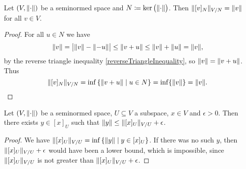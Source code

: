 \begin{proposition} \label{quotientNormFromKernelSeminorm}
Let $\sSet{V,\norm{\cdot}}$ be a seminormed space and $N \coloneqq \ker\big(\lVert\cdot\rVert\big)$. Then $\lVert[v]_N\rVert_{V/N} = \lVert v\rVert$ for all $v\in V$.
\end{proposition}
\begin{proof}
For all $u\in N$ we have
\[ \lVert v\rVert = \big|\lVert v\rVert - \lVert-u\rVert\big| \leq \lVert v + u\rVert \leq \lVert v\rVert+\lVert u\rVert = \lVert v\rVert, \]
by the reverse triangle inequality \ref{reverseTriangleInequality}, so $\lVert v\rVert = \lVert v+u\rVert$. Thus
\[ \norm{[v]_N}_{V/N} = \inf \setbuilder{\norm{v+u}}{u\in N} = \inf\{\norm{v}\} = \norm{v}. \]
\end{proof}

\begin{lemma} \label{approximationToQuotientNormLemma}
Let $\sSet{V,\norm{\cdot}}$ be a seminormed space, $U\subseteq V$ a subspace, $x\in V$ and $\epsilon > 0$. Then there exists $y\in [x]_U$ such that $\lVert y\rVert \leq \lVert[x]_U\rVert_{V/U} + \epsilon$.
\end{lemma}
\begin{proof}
We have $\norm{[x]_U}_{V/U} = \inf\setbuilder{\norm{y}}{y\in [x]_U}$. If there was no such $y$, then $\lVert[x]_U\rVert_{V/U} + \epsilon$ would have been a lower bound, which is impossible, since $\lVert[x]_U\rVert_{V/U}$ is not greater than $\lVert[x]_U\rVert_{V/U} + \epsilon$.
\end{proof}

